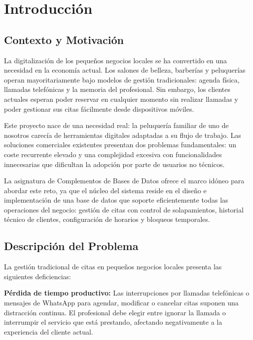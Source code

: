 
\chapter{Introducci\'on}\label{cap:introduccion}

\section{Contexto y Motivaci\'on}\label{sec:contexto}

La digitalizaci\'on de los peque\~nos negocios locales se ha convertido en una necesidad en la econom\'ia actual. Los salones de belleza, barber\'ias y peluquer\'ias operan mayoritariamente bajo modelos de gesti\'on tradicionales: agenda f\'isica, llamadas telef\'onicas y la memoria del profesional. Sin embargo, los clientes actuales esperan poder reservar en cualquier momento sin realizar llamadas y poder gestionar sus citas fácilmente desde dispositivos m\'oviles.

Este proyecto nace de una necesidad real: la peluquer\'ia familiar de uno de nosotros carec\'ia de herramientas digitales adaptadas a su flujo de trabajo. Las soluciones comerciales existentes presentan dos problemas fundamentales: un coste recurrente elevado y una complejidad excesiva con funcionalidades innecesarias que dificultan la adopci\'on por parte de usuarios no t\'ecnicos.

La asignatura de Complementos de Bases de Datos ofrece el marco id\'oneo para abordar este reto, ya que el n\'ucleo del sistema reside en el dise\~no e implementaci\'on de una base de datos que soporte eficientemente todas las operaciones del negocio: gesti\'on de citas con control de solapamientos, historial t\'ecnico de clientes, configuraci\'on de horarios y bloqueos temporales.

\section{Descripci\'on del Problema}\label{sec:problema}

La gesti\'on tradicional de citas en peque\~nos negocios locales presenta las siguientes deficiencias:

\textbf{P\'erdida de tiempo productivo:} Las interrupciones por llamadas telef\'onicas o mensajes de WhatsApp para agendar, modificar o cancelar citas suponen una distracci\'on continua. El profesional debe elegir entre ignorar la llamada o interrumpir el servicio que est\'a prestando, afectando negativamente a la experiencia del cliente actual.

